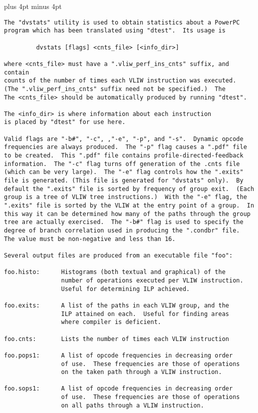 \renewcommand{\baselinestretch}{1.1}
\def\secparindent{\hskip17pt\relax}
\parskip 3pt plus 4pt minus 4pt
\oddsidemargin -0.3in
\evensidemargin -0.3in
\textwidth6.5in
\topmargin -1.0in

\pagestyle{empty}



\begin{small}
\begin{verbatim}
The "dvstats" utility is used to obtain statistics about a PowerPC
program which has been translated using "dtest".  Its usage is

         dvstats [flags] <cnts_file> [<info_dir>]

where <cnts_file> must have a ".vliw_perf_ins_cnts" suffix, and contain
counts of the number of times each VLIW instruction was executed.
(The ".vliw_perf_ins_cnts" suffix need not be specified.)  The
The <cnts_file> should be automatically produced by running "dtest".

The <info_dir> is where information about each instruction
is placed by "dtest" for use here. 

Valid flags are "-b#", "-c", ,"-e", "-p", and "-s".  Dynamic opcode
frequencies are always produced.  The "-p" flag causes a ".pdf" file
to be created.  This ".pdf" file contains profile-directed-feedback
information.  The "-c" flag turns off generation of the .cnts file
(which can be very large).  The "-e" flag controls how the ".exits"
file is generated. (This file is generated for "dvstats" only).  By
default the ".exits" file is sorted by frequency of group exit.  (Each
group is a tree of VLIW tree instructions.)  With the "-e" flag, the
".exits" file is sorted by the VLIW at the entry point of a group.  In
this way it can be determined how many of the paths through the group
tree are actually exercised.  The "-b#" flag is used to specify the
degree of branch correlation used in producing the ".condbr" file.
The value must be non-negative and less than 16.

Several output files are produced from an executable file "foo":

foo.histo:      Histograms (both textual and graphical) of the
                number of operations executed per VLIW instruction.
                Useful for determining ILP achieved.

foo.exits:      A list of the paths in each VLIW group, and the
                ILP attained on each.  Useful for finding areas
                where compiler is deficient.

foo.cnts:       Lists the number of times each VLIW instruction

foo.pops1:      A list of opcode frequencies in decreasing order
                of use.  These frequencies are those of operations
                on the taken path through a VLIW instruction.

foo.sops1:      A list of opcode frequencies in decreasing order
                of use.  These frequencies are those of operations
                on all paths through a VLIW instruction.
\end{verbatim}
\end{small}


